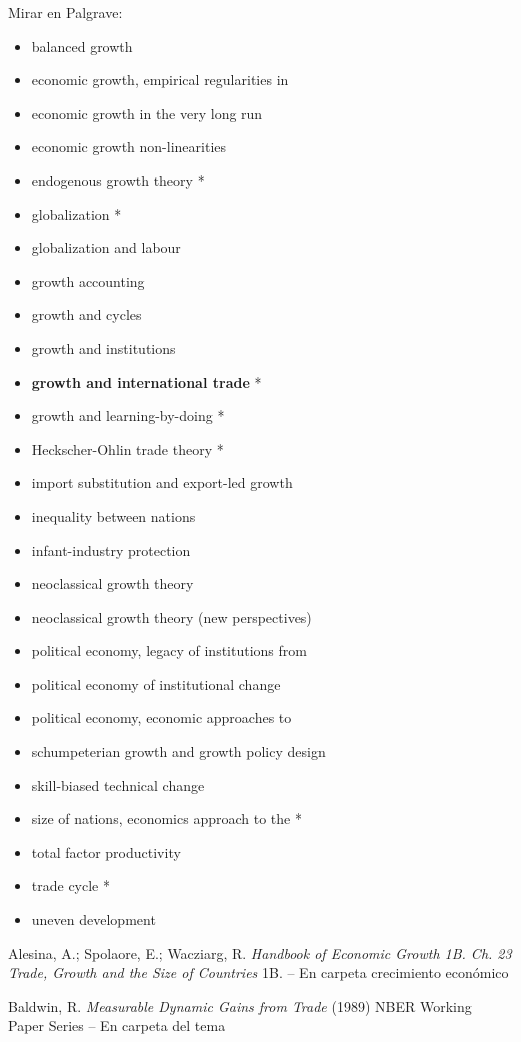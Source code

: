\documentclass{nuevotema}
\begin{document}
Mirar en Palgrave:
\begin{itemize}
	\item balanced growth
	\item economic growth, empirical regularities in 
	\item economic growth in the very long run
	\item economic growth non-linearities
	\item endogenous growth theory *
	\item globalization *
	\item globalization and labour
	\item growth accounting
	\item growth and cycles
	\item growth and institutions
	\item \textbf{growth and international trade} *
	\item growth and learning-by-doing *
	\item Heckscher-Ohlin trade theory *
	\item import substitution and export-led growth
	\item inequality between nations
	\item infant-industry protection
	\item neoclassical growth theory
	\item neoclassical growth theory (new perspectives)
	\item political economy, legacy of institutions from
	\item political economy of institutional change
	\item political economy, economic approaches to
	\item schumpeterian growth and growth policy design
	\item skill-biased technical change
	\item size of nations, economics approach to the *
	\item total factor productivity 
	\item trade cycle *
	\item uneven development
\end{itemize}

Alesina, A.; Spolaore, E.; Wacziarg, R. \textit{Handbook of Economic Growth 1B. Ch. 23 Trade, Growth and the Size of Countries} 1B. -- En carpeta crecimiento económico

Baldwin, R. \textit{Measurable Dynamic Gains from Trade} (1989) NBER Working Paper Series -- En carpeta del tema
\end{document}
